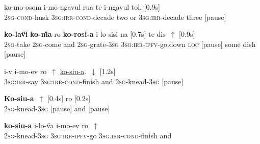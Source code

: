 \documentclass[output=paper]{LSP/langsci}
\begin{document}
  \begin{appendixexe}
 \ex \label{Guapp7}
\gll    ko-mo-osom       i-mo-ngavul                rua   te     i-ngavul    tol, [0.9s]\\     	       
 \textsc{2sg}-\textsc{cond}-husk   \textsc{3sg:irr-cond}-decade   two   or     \textsc{3sg:irr}-decade    three [pause]\\
\glt {} 
\end{appendixexe}

  \begin{appendixexe}
 \ex \label{Guapp8}
\gll    \textbf{ko-la\H{v}i}      \textbf{ko-\H{m}a} ro      \textbf{ko-rosi-a}  i-lo-sisi                 na  [0.7s] te dis~$\uparrow$ [0.9s]\\     	       
 \textsc{2sg}-take   \textsc{2sg}-come  and \textsc{2sg}-grate-\textsc{3sg} \textsc{3sg:irr-ipfv}-go.down   \textsc{loc} [pause] some dish [pause]\\
\glt {} 
\end{appendixexe}

  \begin{appendixexe}
 \ex \label{Guapp9}
\gll  i-v             i-mo-ev                  ro~$\uparrow$     \underline{ko-siu-a}.~$\downarrow$  [1.2s]  \\     	       
 \textsc{3sg:irr}-say   \textsc{3sg:irr-cond}-finish   and   \textsc{2sg}-knead-\textsc{3sg}  [pause]\\
\glt {} 
\end{appendixexe}

  \begin{appendixexe}
 \ex \label{Guapp10}
\gll  \textbf{Ko-siu-a}~$\uparrow$  [0.4s] ro [0.2s] \\     	       
\textsc{2sg}-knead-\textsc{3sg} [pause]  and [pause]\\
\glt {} 
\end{appendixexe}


  \begin{appendixexe}
 \ex \label{Guapp11}
\gll  \textbf{ko-siu-a} i-lo-\H{v}a                  i-mo-ev                  ro~$\uparrow$   \\     
\textsc{2sg}-knead-\textsc{3sg} \textsc{3sg:irr-ipfv}-go     \textsc{3sg.irr-cond}-finish   and  \\
\glt {} 
\end{appendixexe}
\end{document}
